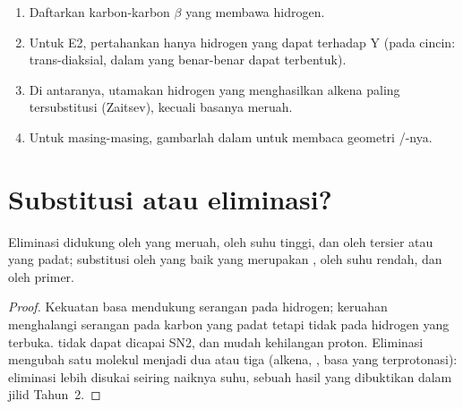 \begin{method}\label{met:b1:elimination:predict-alkene}
\begin{enumerate}
  \item Daftarkan karbon-karbon $\beta$ yang membawa hidrogen.
  \item Untuk E2, pertahankan hanya hidrogen yang dapat 
        terhadap Y (pada cincin: trans-diaksial, dalam  yang
        benar-benar dapat terbentuk).
  \item Di antaranya, utamakan hidrogen yang menghasilkan alkena paling
        tersubstitusi (Zaitsev), kecuali basanya meruah.
  \item Untuk masing-masing, gambarlah  dalam  untuk membaca geometri /-nya.
\end{enumerate}
\end{method}

\section{Substitusi atau eliminasi?}

\begin{proposition}\label{prop:b1:elimination:sn-vs-e}
Eliminasi didukung oleh  yang meruah, oleh suhu tinggi, dan oleh
 tersier atau yang padat; substitusi oleh  yang baik
yang merupakan , oleh suhu rendah, dan oleh  primer.
\end{proposition}

\begin{proof}
Kekuatan basa mendukung serangan pada hidrogen; keruahan menghalangi
serangan pada karbon yang padat tetapi tidak pada hidrogen yang terbuka.
 tidak dapat dicapai SN2, dan  mudah
kehilangan proton. Eliminasi mengubah satu molekul menjadi dua atau tiga
(alkena, , basa yang terprotonasi): eliminasi lebih disukai
seiring naiknya suhu, sebuah hasil yang dibuktikan dalam jilid Tahun~2.
\end{proof}

